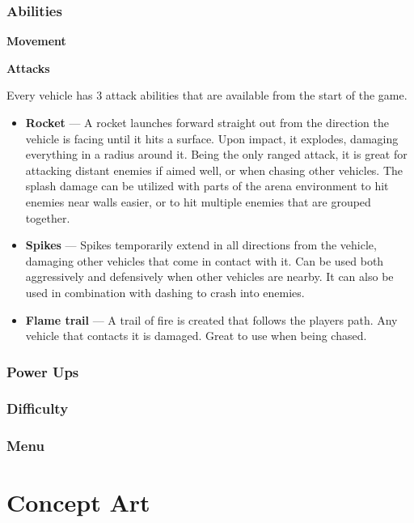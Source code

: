 \documentclass{article}
\theoremstyle{definition}
\begin{document}
\subsubsection{Abilities}

\textbf{Movement}

\textbf{Attacks}

Every vehicle has 3 attack abilities that are available from the start of the game.

\begin{itemize}
  \item \textbf{Rocket} --- A rocket launches forward straight out from the
    direction the vehicle is facing until it hits a surface. Upon impact, it
    explodes, damaging everything in a radius around it. Being the only ranged
    attack, it is great for attacking distant enemies if aimed well, or when
    chasing other vehicles. The splash damage can be utilized with parts of the
    arena environment to hit enemies near walls easier, or to hit multiple
    enemies that are grouped together.
  \item \textbf{Spikes} --- Spikes temporarily extend in all directions from
    the vehicle, damaging other vehicles that come in contact with it. Can be
    used both aggressively and defensively when other vehicles are nearby. It
    can also be used in combination with dashing to crash into enemies.
  \item \textbf{Flame trail} --- A trail of fire is created that follows the
    players path. Any vehicle that contacts it is damaged. Great to use when
    being chased.
\end{itemize}


\subsubsection{Power Ups}
\subsubsection{Difficulty}
\subsubsection{Menu}

\section{Concept Art}
\end{document}
